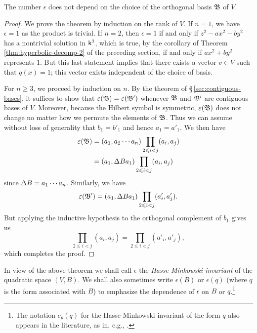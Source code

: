 \begin{theorem}{\normalfont\cite[pp.~35--36]{serre2012course}}
    The number \(\epsilon\) does not depend on the choice of the orthogonal basis \(\mathfrak{B}\) of \(V\).
\end{theorem}

\begin{proof}
    We prove the theorem by induction on the rank of \(V\). If \(n = 1\), we have \(\epsilon = 1\) as the product is trivial. If \(n = 2\), then \(\epsilon = 1\) if and only if \(z^2 - ax^2 - by^2\) has a nontrivial solution in \(\mathsf{k}^3\), which is true, by the corollary of Theorem \ref{thm:hyperbolic-decomp-2} of the preceding section, if and only if \(ax^2 + by^2\) represents \(1\). But this last statement implies that there exists a vector \(v \in V\) such that \(q(x) = 1\); this vector exists independent of the choice of basis.

    For \(n \geq 3\), we proceed by induction on \(n\). By the theorem of \S\,\ref{sec:contiguous-bases}, it suffices to show that \(\varepsilon(\mathfrak{B}) = \varepsilon(\mathfrak{B}')\) whenever \(\mathfrak{B}\) and \(\mathfrak{B}'\) are contiguous bases of \(V\). Moreover, because the Hilbert symbol is symmetric, \(\varepsilon(\mathfrak{B})\) does not change no matter how we permute the elements of \(\mathfrak{B}\). Thus we can assume without loss of generality that \(b_1 = b'_1\) and hence \(a_1 = a'_1\). We then have
    \begin{align*}
        \varepsilon(\mathfrak{B})  &= (a_1, a_2 \cdots a_n) \prod_{2 \leqslant i <j} (a_i, a_j) \\
                                &= (a_1, {\Delta} B a_1) \prod_{2 \leqslant i <j} (a_i, a_j)
    \end{align*}
    since \({\Delta} B = a_1 \cdots a_n\). Similarly, we have
    \[
        \varepsilon(\mathfrak{B'}) = (a_1, {\Delta} B a_1) \prod_{2 \leqslant i <j} (a'_i, a'_j).
    \]
    But applying the inductive hypothesis to the orthogonal complement of \(b_1\) gives us
    \[
        \prod_{2 \leq i <j} (a_i, a_j) = \prod_{2 \leq i <j} (a'_i, a'_j),  
    \]
    which completes the proof.
\end{proof}

In view of the above theorem we shall call \(\epsilon\) the \emph{Hasse-Minkowski invariant} of the quadratic space \((V, B)\). We shall also sometimes write \(\epsilon(B)\) or \(\epsilon(q)\) (where \(q\) is the form associated with \(B\)) to emphasize the dependence of \(\epsilon\) on \(B\) or \(q\).\footnote{The notation \(c_p(q)\) for the Hasse-Minkowski invariant of the form \(q\) also appears in the literature, as in, e.g., \cite{jones1950arithmetic,cassels2008rational}.}


